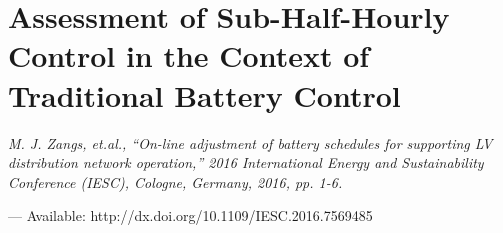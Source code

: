 \chapter{Assessment of Sub-Half-Hourly Control in the Context of Traditional Battery Control}
\label{ch1}

\singlespacing
\epigraph{\textit{M. J. Zangs, et.al., ``On-line adjustment of battery schedules for supporting LV distribution network operation,'' 2016 International Energy and Sustainability Conference (IESC), Cologne, Germany, 2016, pp. 1-6.}}{--- Available: http://dx.doi.org/10.1109/IESC.2016.7569485}
\doublespacing




